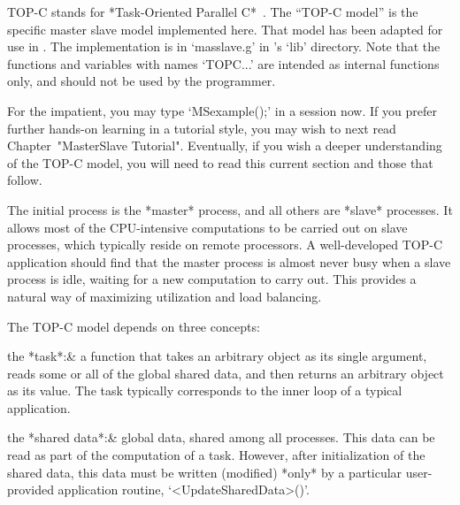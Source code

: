 

TOP-C stands for *Task-Oriented Parallel  C*~\cite{Coo96}.   The  ``TOP-C
model'' is the specific master slave model implemented here.  That  model
has  been  adapted  for  use  in  {\ParGAP}.  The  implementation  is  in
`masslave.g' in {\ParGAP}'s `lib' directory. Note that the functions  and
variables with names `TOPC...' are intended as internal  functions  only,
and should not be used by the {\GAP} programmer.

For the impatient, you may type `MSexample();'  in  a  {\ParGAP}  session
now. If you prefer further hands-on learning in a tutorial style, you may
wish to next read Chapter~"MasterSlave Tutorial". Eventually, if you wish
a deeper understanding of the TOP-C model, you will  need  to  read  this
current section and those that follow.

The initial {\GAP} process is the *master* process, and  all  others  are
*slave* processes. It allows most of the CPU-intensive computations to be
carried  out  on  slave  processes,  which  typically  reside  on  remote
processors. A well-developed  TOP-C  application  should  find  that  the
master process is almost never busy when a slave process is idle, waiting
for a new computation to carry  out.  This  provides  a  natural  way  of
maximizing utilization and load balancing.

The TOP-C model depends on three concepts:

\beginitems

the *task*:&
    a function that takes an arbitrary object  as  its  single  argument,
    reads some or all of the global  shared data,  and  then  returns  an
    arbitrary object as its value. The task typically corresponds to  the
    inner loop of a typical application.

the *shared data*:&
    global data, shared among all processes. This data  can  be  read  as
    part of the computation of a task. However, after  initialization  of
    the shared data, this data must be written  (modified)  *only*  by  a
    particular user-provided application routine, `<UpdateSharedData>()'.


